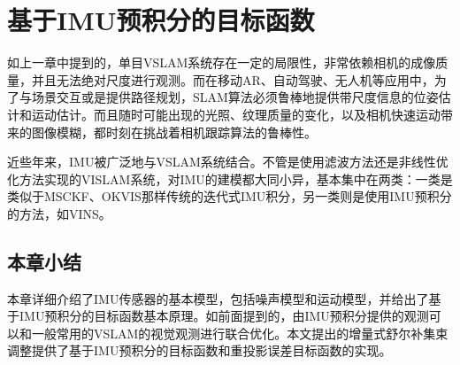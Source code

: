 \chapter{基于IMU预积分的目标函数}\label{ch:vislam}

如上一章中提到的，单目VSLAM系统存在一定的局限性，非常依赖相机的成像质量，并且无法绝对尺度进行观测\citep{jones2011visual}。而在移动AR、自动驾驶、无人机等应用中，为了与场景交互或是提供路径规划，SLAM算法必须鲁棒地提供带尺度信息的位姿估计和运动估计。而且随时可能出现的光照、纹理质量的变化，以及相机快速运动带来的图像模糊，都时刻在挑战着相机跟踪算法的鲁棒性。

近些年来，IMU被广泛地与VSLAM系统结合。不管是使用滤波方法还是非线性优化方法实现的VISLAM系统，对IMU的建模都大同小异，基本集中在两类：一类是类似于MSCKF\citep{mourikis2007multi}、OKVIS\citep{leutenegger2015keyframe}那样传统的迭代式IMU积分，另一类则是使用IMU预积分\citep{forster2017manifold}的方法，如VINS\citep{li2017monocular}。



\section{本章小结}

本章详细介绍了IMU传感器的基本模型，包括噪声模型和运动模型，并给出了基于IMU预积分的目标函数基本原理。如前面提到的，由IMU预积分提供的观测可以和一般常用的VSLAM的视觉观测进行联合优化。本文提出的增量式舒尔补集束调整提供了基于IMU预积分的目标函数和重投影误差目标函数的实现。
